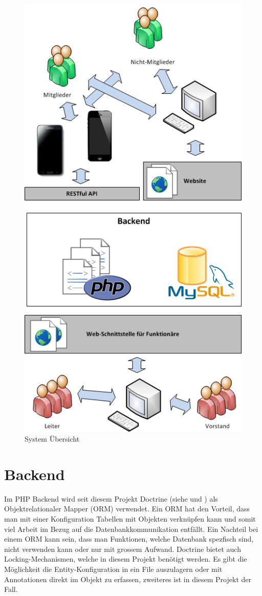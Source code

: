 \begin{figure}[h]
\centering
\includegraphics[scale=0.5]{images/visio/SystemScope.png}
\caption{System Übersicht}
\label{fig:system_scope}
\end{figure}

\section{Backend}\label{arch_backend}
Im PHP Backend wird seit diesem Projekt Doctrine (siehe \cite{doctrine} und \cite{dunglas2013persistence}) als Objektrelationaler Mapper (ORM) verwendet. Ein ORM hat den Vorteil, dass man mit einer Konfiguration Tabellen mit Objekten verknüpfen kann und somit viel Arbeit im Bezug auf die Datenbankkommunikation entfällt. Ein Nachteil bei einem ORM kann sein, dass man Funktionen, welche Datenbank spezfisch sind, nicht verwenden kann oder nur mit grossem Aufwand. Doctrine bietet auch Locking-Mechanismen, welche in diesem Projekt benötigt werden. Es gibt die Möglichkeit die Entity-Konfiguration in ein File auszulagern oder mit Annotationen direkt im Objekt zu erfassen, zweiteres ist in diesem Projekt der Fall.

